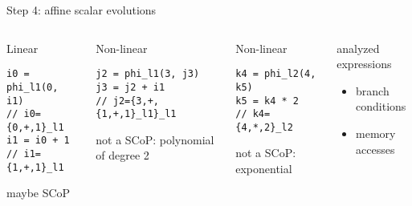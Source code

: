 \documentclass{beamer}
\begin{document}
\begin{frame}[fragile]{Step 4: affine scalar evolutions}
  \begin{columns}[T,onlytextwidth] %
    \begin{block}{\small Linear}
      \begin{lstlisting}
i0 = phi_l1(0, i1)
// i0={0,+,1}_l1
i1 = i0 + 1
// i1={1,+,1}_l1
      \end{lstlisting}

      {\small \color{myblue} maybe SCoP}
    \end{block}
    \pause
    \begin{block}{\small Non-linear} 
      \begin{lstlisting}
j2 = phi_l1(3, j3)
j3 = j2 + i1
// j2={3,+,{1,+,1}_l1}_l1
      \end{lstlisting}
      {\small \color{myred} not a SCoP: polynomial of degree 2}
    \end{block}
    \pause
    \begin{block}{\small Non-linear} 
      \begin{lstlisting}
k4 = phi_l2(4, k5)
k5 = k4 * 2
// k4={4,*,2}_l2
      \end{lstlisting}
      {\small \color{myred} not a SCoP: exponential}
    \end{block}

    \vspace{.5cm}
    \pause
    \begin{block}{\small analyzed expressions}
      \begin{itemize}
      \item branch conditions
      \item memory accesses
      \end{itemize}
    \end{block}
  \end{columns}
\end{frame}
\end{document}
